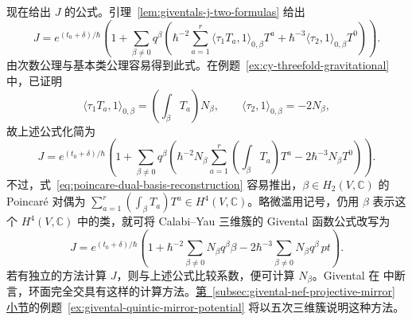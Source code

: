 现在给出 $J$ 的公式。引理~\ref{lem:giventals-j-two-formulas} 给出
\[
J=e^{(t_0+\delta)/\hbar}\left(1+\sum_{\beta\ne0}q^\beta
\left(\hbar^{-2}\sum_{a=1}^r\langle\tau_1T_a,1\rangle_{0,\beta}T^a
+\hbar^{-3}\langle\tau_2,1\rangle_{0,\beta}T^0\right)\right).
\]
由次数公理与基本类公理容易得到此式。在例题~\ref{ex:cy-threefold-gravitational} 中，已证明
\[
\langle\tau_1T_a,1\rangle_{0,\beta}=\left(\int_\beta T_a\right)N_\beta,
\qquad\langle\tau_2,1\rangle_{0,\beta}=-2N_\beta,
\]
故上述公式化简为
\begin{equation}\label{eq:cy-threefold-j-invariants}
J=e^{(t_0+\delta)/\hbar}\left(1+\sum_{\beta\ne0}q^\beta
\left(\hbar^{-2}N_\beta\sum_{a=1}^r\left(\int_\beta T_a\right)T^a
-2\hbar^{-3}N_\beta T^0\right)\right).
\end{equation}
不过，式~\eqref{eq:poincare-dual-basis-reconstruction} 容易推出，$\beta\in H_2(V,\mathbb C)$ 的 Poincaré 对偶为 $\sum_{a=1}^r(\int_\beta T_a)T^a\in H^4(V,\mathbb C)$。略微滥用记号，仍用 $\beta$ 表示这个 $H^4(V,\mathbb C)$ 中的类，就可将 Calabi--Yau 三维簇的 Givental 函数公式改写为
\begin{equation}\label{eq:cy-threefold-j-poincare-dual}
J=e^{(t_0+\delta)/\hbar}\left(1+\hbar^{-2}\sum_{\beta\ne0}N_\beta q^\beta\beta
-2\hbar^{-3}\sum_{\beta\ne0}N_\beta q^\beta\,pt\right).
\end{equation}
若有独立的方法计算 $J$，则与上述公式比较系数，便可计算 $N_\beta$。Givental 在  中断言，环面完全交具有这样的计算方法。\hyperref[subsec:givental-nef-projective-mirror]{第~\ref*{subsec:givental-nef-projective-mirror} 小节}的例题~\ref{ex:givental-quintic-mirror-potential} 将以五次三维簇说明这种方法。

